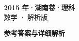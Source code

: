 \documentclass[zihao=-4, a4paper]{ctexart}
\begin{document}
\begin{center}
  {\Large\bfseries 2015 年·湖南卷·理科}\\[4pt]
  {\large 数学 · 解析版}
\end{center}
\medskip
{}

\clearpage
{}
\begin{center}{\Large\bfseries 参考答案与详细解析}\end{center}
\medskip

\end{document}
